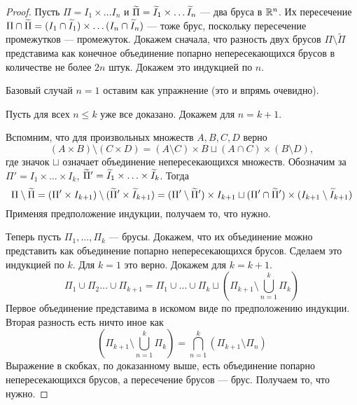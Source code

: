 	\begin{proof}
		Пусть $\Pi = I_1 \times \ldots I_n$ и $\widetilde{\Pi} = \widetilde{I}_1 \times \ldots \widetilde{I}_n$ --- два бруса в $\mathbb{R}^n$. Их пересечение $\Pi \cap \widetilde{\Pi} = (I_1 \cap \widetilde{I}_1) \times \ldots (I_n\cap \widetilde{I}_n)$ --- тоже брус, поскольку пересечение промежутков --- промежуток.
		Докажем сначала, что разность двух брусов $\Pi \setminus \widetilde{\Pi}$ представима как конечное объединение попарно непересекающихся брусов в количестве не более $2n$ штук. Докажем это индукцией по $n$.
		\par Базовый случай $n=1$ оставим как упражнение (это и впрямь очевидно).
		\par Пусть для всех $n \leqslant k$ уже все доказано. Докажем для $n = k + 1$. 
		\par Вспомним, что для произвольных множеств $A, B, C, D$ верно
		$$
			(A\times B) \setminus (C \times D) = (A \setminus C) \times B \sqcup (A\cap C)\times (B \setminus D),
		$$
		где значок $\sqcup$ означает объединение непересекающихся множеств.
		Обозначим за $\Pi' = I_1 \times \ldots \times I_k$, $\widetilde{\Pi}' = \widetilde{I}_1 \times \ldots \times \widetilde{I}_k$. Тогда
		$$
			\Pi \setminus \widetilde{\Pi} = (\Pi' \times I_{k+1}) \setminus (\widetilde{\Pi}' \times \widetilde{I}_{k + 1}) = (\Pi' \setminus \widetilde{\Pi}')\times I_{k + 1} \sqcup (\Pi' \cap \widetilde{\Pi}')\times (I_{k + 1} \setminus \widetilde{I}_{k + 1})
		$$
		Применяя предположение индукции, получаем то, что нужно.
		\par Теперь пусть $\Pi_1, \ldots, \Pi_k$ --- брусы. Докажем, что их объединение можно представить как объединение попарно непересекающихся брусов. Сделаем это индукцией по $k$. Для $k = 1$ это верно. Докажем для $k = k + 1$.
		$$
			\Pi_1 \cup \Pi_2 \ldots \cup \Pi_{k + 1} = \Pi_1 \cup \ldots \cup \Pi_{k} \sqcup \left(\Pi_{k + 1} \setminus \bigcup\limits_{n =1}^k\Pi_k\right)
		$$
		Первое объединение представима в искомом виде по предположению индукции. Вторая разность есть ничто иное как
		$$
			\left(\Pi_{k + 1} \setminus \bigcup\limits_{n =1}^k\Pi_k\right) = \bigcap\limits_{n=1}^{k}(\Pi_{k + 1} \setminus \Pi_n)
		$$
		Выражение в скобках, по доказанному выше, есть объединение попарно непересекающихся брусов, а пересечение брусов --- брус. Получаем то, что нужно.
	\end{proof}